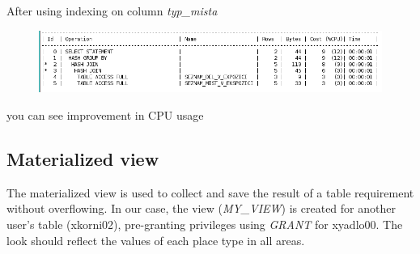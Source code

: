 \documentclass[12pt,a4paper]{article}
\begin{document}
\noindent After using indexing on column \textit{typ\_mista}

\begin{figure}[h!]
    \centering
    \includegraphics[width=\textwidth,height=\textheight,keepaspectratio]
    {new_explain_plan.png}
\end{figure}

\noindent you can see improvement in CPU usage

\subsection{Materialized view}

The materialized view is used to collect and save the result of a table 
requirement without overflowing. In our case, the view (\textit{MY\_VIEW}) is 
created for another user's table (xkorni02), pre-granting privileges using 
\textit{GRANT} for xyadlo00. The look should reflect the values of each place 
type in all areas.
\end{document}
